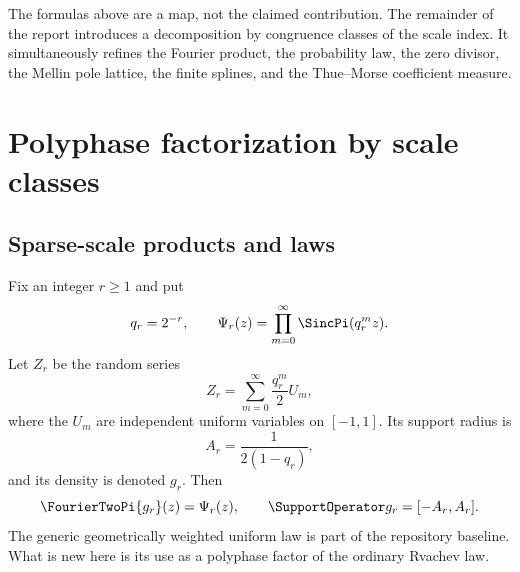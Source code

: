 \documentclass[11pt]{article}
\theoremstyle{definition}
\theoremstyle{remark}
\begin{document}
\begin{statusboxPartx}[Transition]
The formulas above are a map, not the claimed contribution.  The remainder of
the report introduces a decomposition by congruence classes of the scale index.
It simultaneously refines the Fourier product, the probability law, the zero
divisor, the Mellin pole lattice, the finite splines, and the Thue--Morse
coefficient measure.
\end{statusboxPartx}

\section{Polyphase factorization by scale classes}
\label{p5:sec:polyphase}

\subsection{Sparse-scale products and laws}

Fix an integer $r\ge1$ and put
\begin{equation}
 q_r=2^{-r},\qquad
 \Psi_r(z)=\prod_{m=0}^{\infty}\SincPi(q_r^m z).            \label{p5:eq:Psi-def}
\end{equation}
Let $Z_r$ be the random series
\begin{equation}
 Z_r=\sum_{m=0}^{\infty}\frac{q_r^m}{2}U_m,                \label{p5:eq:Zr-series}
\end{equation}
where the $U_m$ are independent uniform variables on $[-1,1]$.  Its support
radius is
\begin{equation}
 A_r=\frac1{2(1-q_r)},                                     \label{p5:eq:Ar}
\end{equation}
and its density is denoted $g_r$.  Then
\begin{equation}
 \FourierTwoPi{g_r}(z)=\Psi_r(z),
 \qquad \SupportOperator g_r=[-A_r,A_r].                              \label{p5:eq:gr-Fourier-support}
\end{equation}
The generic geometrically weighted uniform law is part of the repository
baseline.  What is new here is its use as a polyphase factor of the ordinary
Rvachev law.
\end{document}

